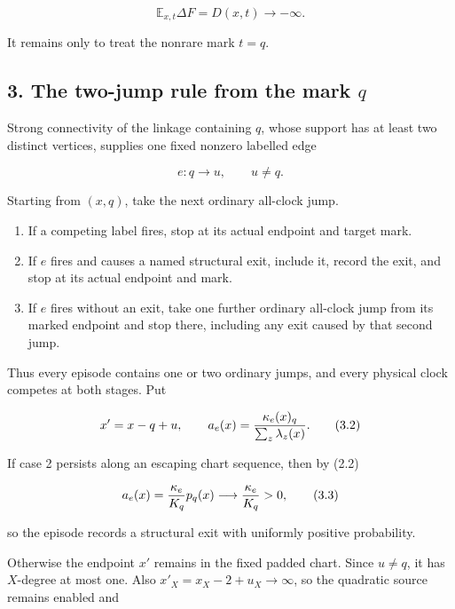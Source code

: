 \[
                 \mathbb E_{x,t}\Delta F=D(x,t)
                    \longrightarrow-\infty.              \tag{2.3}
\]

It remains only to treat the nonrare mark \(t=q\).

\subsection{\texorpdfstring{3. The two-jump rule from the mark
\(q\)}{3. The two-jump rule from the mark q}}

Strong connectivity of the linkage containing \(q\), whose support has
at least two distinct vertices, supplies one fixed nonzero labelled edge

\[
                              e:q\longrightarrow u,
                              \qquad u\ne q.               \tag{3.1}
\]

Starting from \((x,q)\), take the next ordinary all-clock jump.

\begin{enumerate}
\def\labelenumi{\arabic{enumi}.}
\tightlist
\item
  If a competing label fires, stop at its actual endpoint and target
  mark.
\item
  If \(e\) fires and causes a named structural exit, include it, record
  the exit, and stop at its actual endpoint and mark.
\item
  If \(e\) fires without an exit, take one further ordinary all-clock
  jump from its marked endpoint and stop there, including any exit
  caused by that second jump.
\end{enumerate}

Thus every episode contains one or two ordinary jumps, and every
physical clock competes at both stages. Put

\[
 x'=x-q+u,
 \qquad
 a_e(x)={\kappa_e(x)_q\over\sum_z\lambda_z(x)}.            \tag{3.2}
\]

If case 2 persists along an escaping chart sequence, then by (2.2)

\[
                a_e(x)={\kappa_e\over K_q}p_q(x)
                      \longrightarrow{\kappa_e\over K_q}>0, \tag{3.3}
\]

so the episode records a structural exit with uniformly positive
probability.

Otherwise the endpoint \(x'\) remains in the fixed padded chart. Since
\(u\ne q\), it has \(X\)-degree at most one. Also
\(x'_X=x_X-2+u_X\to\infty\), so the quadratic source remains enabled and

